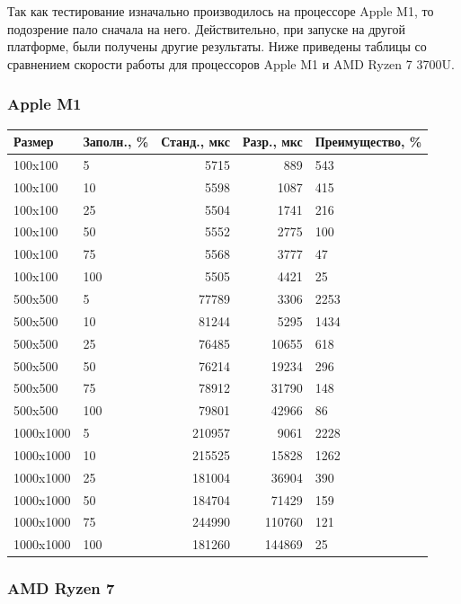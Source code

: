 \documentclass[a4paper,12pt]{extarticle}
\begin{document}
Так как тестирование изначально производилось на процессоре Apple M1, то подозрение пало сначала на него. Действительно, при запуске на другой платформе, были получены другие результаты. Ниже приведены таблицы со сравнением скорости работы для процессоров Apple M1 и AMD Ryzen 7 3700U.

\subsubsection{Apple M1}

\begin{tabular}{ |l|l|r|r|l| }
\hline
\textbf{Размер} & \textbf{Заполн., \%} & \textbf{Станд., мкс} & \textbf{Разр., мкс} & \textbf{Преимущество, \%} \\ \hline

100x100 & 5 & 5715 & 889 & 543 \\ \hline
100x100 & 10 & 5598 & 1087 & 415 \\ \hline
100x100 & 25 & 5504 & 1741 & 216 \\ \hline
100x100 & 50 & 5552 & 2775 & 100 \\ \hline
100x100 & 75 & 5568 & 3777 & 47 \\ \hline
100x100 & 100 & 5505 & 4421 & 25 \\ \hline
500x500 & 5 & 77789 & 3306 & 2253 \\ \hline
500x500 & 10 & 81244 & 5295 & 1434 \\ \hline
500x500 & 25 & 76485 & 10655 & 618 \\ \hline
500x500 & 50 & 76214 & 19234 & 296 \\ \hline
500x500 & 75 & 78912 & 31790 & 148 \\ \hline
500x500 & 100 & 79801 & 42966 & 86 \\ \hline
1000x1000 & 5 & 210957 & 9061 & 2228 \\ \hline
1000x1000 & 10 & 215525 & 15828 & 1262 \\ \hline
1000x1000 & 25 & 181004 & 36904 & 390 \\ \hline
1000x1000 & 50 & 184704 & 71429 & 159 \\ \hline
1000x1000 & 75 & 244990 & 110760 & 121 \\ \hline
1000x1000 & 100 & 181260 & 144869 & 25 \\ \hline
\end{tabular}

\subsubsection{AMD Ryzen 7}
\end{document}
